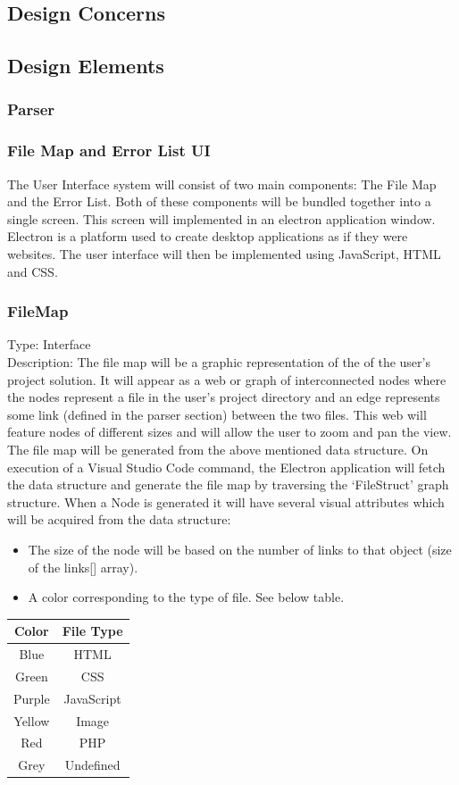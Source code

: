 \documentclass[letterpaper,10pt,titlepage,draftclsnofoot,onecolumn,onesided] {IEEEtran}
\begin{document}
\subsection{Design Concerns}
\subsection{Design Elements}


	\subsubsection{Parser}


	\subsubsection{File Map and Error List UI}
	The User Interface system will consist of two main components: The File Map and the Error List. 
	Both of these components will be bundled together into a single screen. 
	This screen will implemented in an electron application window. 
	Electron is a platform used to create desktop applications as if they were websites.
	The user interface will then be implemented using JavaScript, HTML and CSS.
	
	\subsubsection{FileMap}
	Type: Interface
	\\
	Description: 
	The file map will be a graphic representation of the of the user's project solution. 
	It will appear as a web or graph of interconnected nodes where the nodes represent a file in the user's project directory and an edge represents some link (defined in the parser section) between the two files. 
	This web will feature nodes of different sizes and will allow the user to zoom and pan the view.
	The file map will be generated from the above mentioned data structure. 
	On execution of a Visual Studio Code command, the Electron application will fetch the data structure and generate the file map by traversing the ‘FileStruct' graph structure. 
	When a Node is generated it will have several visual attributes which will be acquired from the data structure:
	\\
	\begin{itemize}
	\item The size of the node will be based on the number of links to that object (size of the links[] array). 
	\item A color corresponding to the type of file. See below table.
	\end{itemize}
	\begin{tabular}{| c | c |}
	\hline
	Color & File Type\\
	\hline
	Blue & HTML \\
	Green & CSS \\
	Purple & JavaScript \\
	Yellow & Image \\
	Red & PHP \\
	Grey & Undefined \\
	\hline
	\end{tabular}
	
\end{document}
